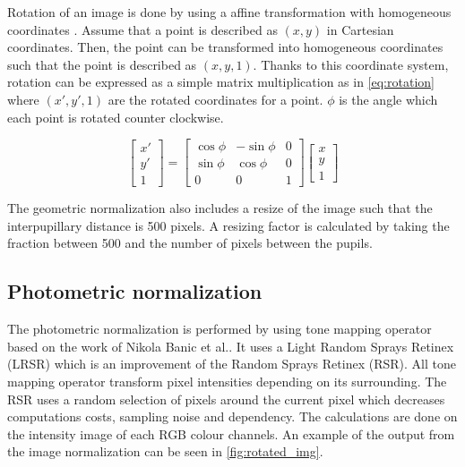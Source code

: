 Rotation of an image is done by using a affine transformation with homogeneous coordinates \cite{li2001generalized}. Assume that a point is described as $(x, y)$ in Cartesian coordinates. Then, the point can be transformed into homogeneous coordinates such that the point is described as $(x, y, 1)$. Thanks to this coordinate system, rotation can be expressed as a simple matrix multiplication as in \cref{eq:rotation} where $(x', y', 1)$ are the rotated coordinates for a point. $\phi$ is the angle which each point is rotated counter clockwise. 

\begin{equation} \label{eq:rotation}
\begin{bmatrix}
x' \\[0.3em]
y' \\[0.3em]
1
\end{bmatrix}
=
\begin{bmatrix}
	\cos{\phi} & -\sin{\phi} & 0 \\[0.3em]
	\sin{\phi} & \cos{\phi}  & 0 \\[0.3em]
	0          & 0           & 1
\end{bmatrix}
\begin{bmatrix}
x \\[0.3em]
y \\[0.3em]
1
\end{bmatrix}
\end{equation}

The geometric normalization also includes a resize of the image such that the interpupillary distance is 500 pixels. A resizing factor is calculated by taking the fraction between 500 and the number of pixels between the pupils.  

\subsection{Photometric normalization} \label{subsec:photo_norm} 

The photometric normalization is performed by using tone mapping operator based on the work of Nikola Banic et al.\cite{badger}. It uses a Light Random Sprays Retinex (LRSR) which is an improvement of the Random Sprays Retinex (RSR)\cite{RSR}. All tone mapping operator transform pixel intensities depending on its surrounding. The RSR uses a random selection of pixels around the current pixel which decreases computations costs, sampling noise and dependency. The calculations are done on the intensity image of each RGB colour channels. An example of the output from the image normalization can be seen in \cref{fig:rotated_img}.

